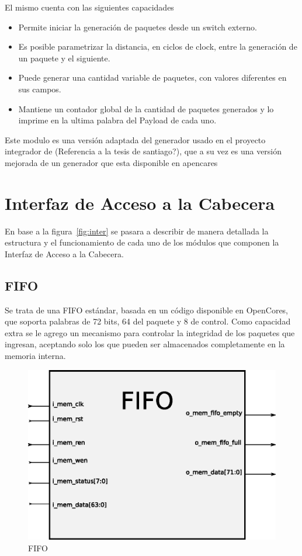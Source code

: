 El mismo cuenta con las siguientes capacidades

\begin{itemize}
	\item Permite iniciar la generación de paquetes desde un switch externo.
	\item Es posible parametrizar la distancia, en ciclos de clock, entre la generación de un paquete y el siguiente.
	\item Puede generar una cantidad variable de paquetes, con valores diferentes en sus campos.
	\item Mantiene un contador global de la cantidad de paquetes generados y lo imprime en la ultima palabra del Payload de cada uno.
\end{itemize}

Este modulo es una versión adaptada del generador usado en el proyecto integrador de (Referencia a la tesis de santiago?), que a su vez es una versión mejorada de un generador que esta disponible en apencares


\section{Interfaz de Acceso a la Cabecera}
En base a la figura~\ref{fig:inter} se pasara a describir de manera detallada la estructura y el funcionamiento de cada uno de los módulos que componen la Interfaz de Acceso a la Cabecera. 

\subsection{FIFO}
Se trata de una FIFO estándar, basada en un código disponible en OpenCores, que soporta palabras de 72 bits, 64 del paquete y 8 de control. Como capacidad extra se le agrego un mecanismo para controlar la integridad de los paquetes que ingresan, aceptando solo los que pueden ser almacenados completamente en la memoria interna. 

\begin{figure}[H]
  \centering
	\includegraphics[scale=0.60]{3-arquitectura/graf/bloqfifo.eps}
  \caption{FIFO}
  \label{fig:gen}
\end{figure}

